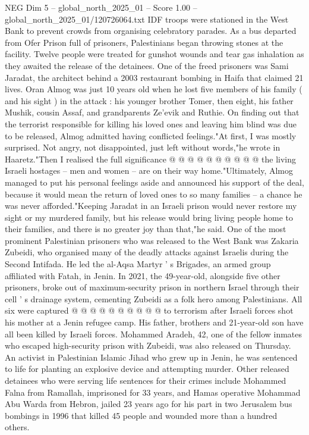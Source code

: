 \begin{textsample}{NEG Dim 5 – global\_north\_2025\_01 – Score 1.00 – global\_north\_2025\_01/120726064.txt}  \label{ex:f5_neg_185}
IDF troops were stationed in the West Bank to prevent crowds from organising celebratory parades.
As a bus departed from Ofer Prison full of prisoners, Palestinians began throwing stones at the facility.
Twelve people were treated for gunshot wounds and tear gas inhalation as they awaited the release of the detainees.
One of the freed prisoners was Sami Jaradat, the architect behind a 2003 restaurant bombing in Haifa that claimed 21 lives.
Oran Almog was just 10 years old when he lost five members of his family ( and his sight ) in the attack : his younger brother Tomer, then eight, his father Mushik, cousin Assaf, and grandparents Ze'evik and Ruthie.
On finding out that the terrorist responsible for killing his loved ones and leaving him blind was due to be released, Almog admitted having conflicted feelings."At first, I was mostly surprised.
Not angry, not disappointed, just left without words,"he wrote in Haaretz."Then I realised the full significance @ @ @ @ @ @ @ @ @ @ the living Israeli hostages -- men and women -- are on their way home."Ultimately, Almog managed to put his personal feelings aside and announced his support of the deal, because it would mean the return of loved ones to so many families -- a chance he was never afforded."Keeping Jaradat in an Israeli prison would never restore my sight or my murdered family, but his release would bring living people home to their families, and there is no greater joy than that,"he said.
One of the most prominent Palestinian prisoners who was released to the West Bank was Zakaria Zubeidi, who organised many of the deadly attacks against Israelis during the Second Intifada.
He led the al-Aqsa Martyr ' s Brigades, an armed group affiliated with Fatah, in Jenin.
In 2021, the 49-year-old, alongside five other prisoners, broke out of maximum-security prison in northern Israel through their cell ' s drainage system, cementing Zubeidi as a folk hero among Palestinians.
All six were captured @ @ @ @ @ @ @ @ @ @ to terrorism after Israeli forces shot his mother at a Jenin refugee camp.
His father, brothers and 21-year-old son have all been killed by Israeli forces.
Mohammed Aradeh, 42, one of the fellow inmates who escaped high-security prison with Zubeidi, was also released on Thursday.
An activist in Palestinian Islamic Jihad who grew up in Jenin, he was sentenced to life for planting an explosive device and attempting murder.
Other released detainees who were serving life sentences for their crimes include Mohammed Falna from Ramallah, imprisoned for 33 years, and Hamas operative Mohammad Abu Warda from Hebron, jailed 23 years ago for his part in two Jerusalem bus bombings in 1996 that killed 45 people and wounded more than a hundred others.

\end{textsample}
